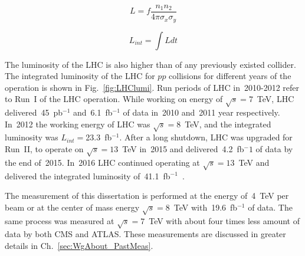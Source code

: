\begin{equation}
L = f \frac{n_1 n_2}{4 \pi \sigma_x \sigma_y}
\end{equation}


\begin{equation}\label{eq:integratedL}
  L_{int}=\int L dt
\end{equation}


The luminosity of the LHC is also higher than of any previously existed collider. The integrated luminosity of the LHC for $pp$ collisions for different years of the operation is shown in Fig.~\ref{fig:LHClumi}. Run periods of LHC in~2010-2012 refer to Run~I of the LHC operation. While working on energy of $\sqrt{s}=7$~TeV, LHC delivered~45~pb$^{-1}$ and~6.1~fb$^{-1}$ of data in~2010 and~2011 year respectively. In~2012 the working energy of LHC was $\sqrt{s}=8$~TeV, and the integrated luminosity was $L_{int}=$23.3~fb$^{-1}$.  After a long shutdown, LHC was upgraded for Run~II, to operate on $\sqrt{s}=13$~TeV in~2015 and delivered~4.2~fb$^-1$ of data by the end of~2015. In~2016 LHC continued operating at $\sqrt{s}=13$~TeV and delivered the integrated luminosity of~41.1~fb$^{-1}$~\cite{ref_LHClumi_twiki}.

The measurement of this dissertation is performed at the energy of~4~TeV per beam or at the center of mass energy $\sqrt{s}=8$~TeV with~19.6~fb$^{-1}$ of data. The same process was measured at $\sqrt{s}=7$~TeV with about four times less amount of data by both CMS and ATLAS. These measurements are discussed in greater details in Ch.~\ref{sec:WgAbout_PastMeas}.

